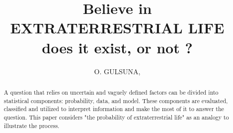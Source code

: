 \documentclass{ieeeaccess}
\begin{document}

\title{
\vspace{-1.2em}
\huge Believe in \\ \Huge EXTRATERRESTRIAL LIFE\\ \normalsize does it exist, or not ?
\vspace{-1em}}
 
 \author{\uppercase{O. Gulsuna}\authorrefmark{*}, 
 }
 




\begin{abstract} A question that relies on uncertain and vaguely defined factors can be divided into statistical components: probability, data, and model. These components are evaluated, classified and utilized to interpret information and make the most of it to answer the question. This paper considers "the probability of extraterrestrial life" as an analogy to illustrate the process.
\end{abstract}

\end{document}
